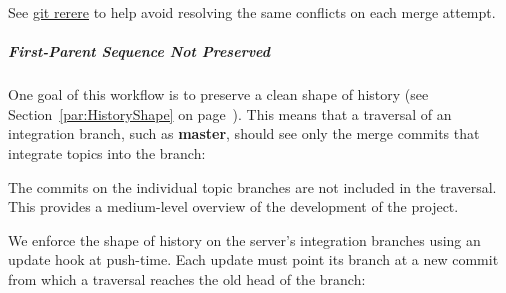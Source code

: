 \begin{figure}
\centering
{}
\label{fig:PushChangesToRelease}
\end{figure}

See \href{https://git-scm.com/docs/git-rerere}{git rerere} to help avoid
resolving the same conflicts on each merge attempt.


\subparagraph{First-Parent Sequence Not Preserved}
\label{subpar:FirstParentSequenceNotPreserved}

One goal of this workflow is to preserve a clean shape of history (see
Section~\ref{par:HistoryShape} on page~\pageref{par:HistoryShape}). This means
that a  traversal of an integration branch, such as
\textbf{master}, should see only the merge commits that integrate topics into
the branch:

\begin{figure}
\centering
{}
\label{fig:TraversalOfMasterBranch}
\end{figure}

The commits on the individual topic branches are not included in the traversal.
This provides a medium-level overview of the development of the project.

We enforce the shape of history on the server's integration branches using an
update hook at push-time. Each update must point its branch at a new commit from
which a  traversal reaches the old head of the branch:


